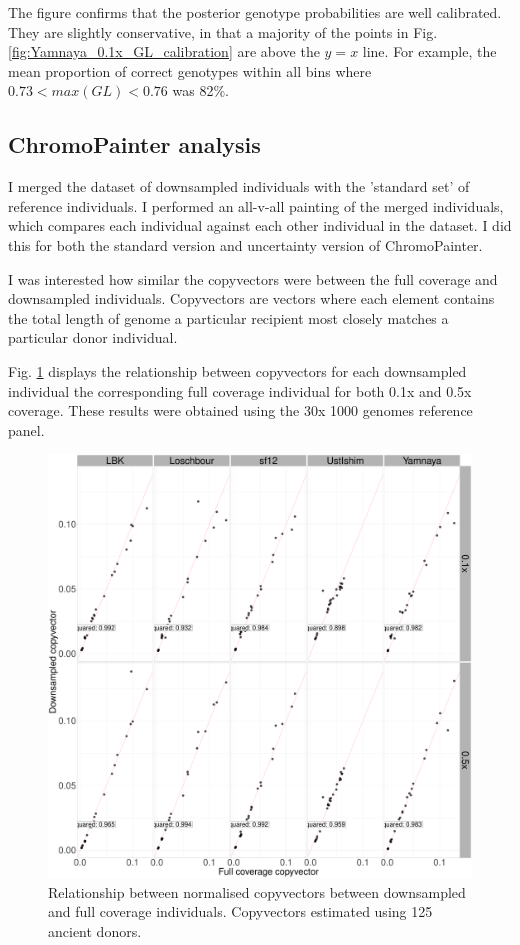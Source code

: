 The figure confirms that the posterior genotype probabilities are well calibrated. They are slightly conservative, in that a majority of the points in Fig. \ref{fig:Yamnaya_0.1x_GL_calibration} are above the $y=x$ line. For example, the mean proportion of correct genotypes within all bins where $0.73 < max(GL) < 0.76$ was 82\%.

\subsection{ChromoPainter analysis}

I merged the dataset of downsampled individuals with the 'standard set' of reference individuals. I performed an all-v-all painting of the merged individuals, which compares each individual against each other individual in the dataset. I did this for both the standard version and uncertainty version of ChromoPainter.

I was interested how similar the copyvectors were between the full coverage and downsampled individuals. Copyvectors are vectors where each element contains the total length of genome a particular recipient most closely matches a particular donor individual. 

Fig. \ref{fig:CP_correlation_allSamples_0.1x_0.5x_30x} displays the relationship between copyvectors for each downsampled individual the corresponding full coverage individual for both 0.1x and 0.5x coverage. These results were obtained using the 30x 1000 genomes reference panel. 

\begin{figure}[htp]
    \centering
    \includegraphics[width=1.0\textwidth]{../images/chapter1/CP_correlation_allSamples_0.1x_0.5x_30x.pdf}
    \caption{Relationship between normalised copyvectors between downsampled and full coverage individuals. Copyvectors estimated using 125 ancient donors.}
    \label{fig:CP_correlation_allSamples_0.1x_0.5x_30x}
\end{figure}

